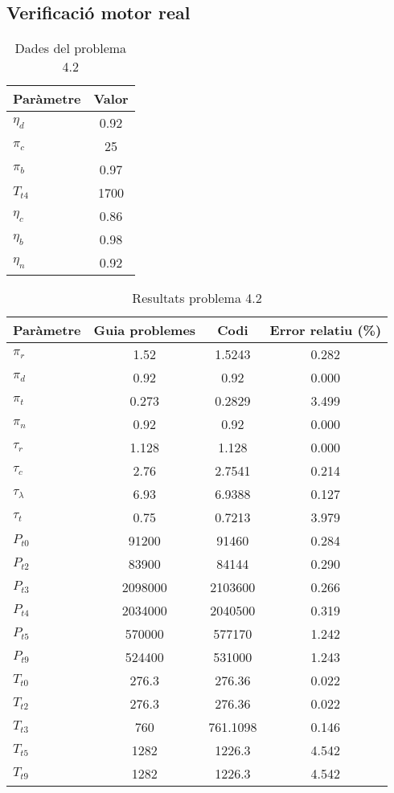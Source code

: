\subsection{Verificació motor real}
\begin{table}[H]
\centering
\begin{tabular}{lc}
\toprule[3pt]
\textbf{Paràmetre}&\textbf{Valor}\\
\midrule[1pt]
$\eta_d$&	0.92\\

$\pi_c$&	25\\

$\pi_b$&0.97\\

$T_{t4}$	&1700\\

$\eta_c$&0.86\\

$\eta_b$&0.98\\

$\eta_n$&0.92\\
\bottomrule[2pt]
\end{tabular}
\caption{Dades del problema 4.2}
\end{table}
\begin{table}[H]
\centering
\begin{tabular}{lccc}
\toprule[3pt]
Paràmetre & Guia problemes & Codi       & Error relatiu (\%) \\ \midrule[1pt]
$\pi_r$ & 1.52    & 1.5243   & 0.282 \\
$\pi_d$ & 0.92    & 0.92     & 0.000 \\
$\pi_t$ & 0.273   & 0.2829   & 3.499 \\
$\pi_n$& 0.92    & 0.92     & 0.000 \\
$\tau_r$& 1.128   & 1.128    & 0.000 \\
$\tau_c$& 2.76    & 2.7541   & 0.214 \\
$\tau_\lambda$& 6.93    & 6.9388   & 0.127 \\
$\tau_t$& 0.75    & 0.7213   & 3.979 \\
$P_{t0}$& 91200   & 91460    & 0.284 \\
$P_{t2}$& 83900   & 84144    & 0.290 \\
$P_{t3}$& 2098000 & 2103600  & 0.266 \\
$P_{t4}$& 2034000 & 2040500  & 0.319 \\
$P_{t5}$& 570000  & 577170   & 1.242 \\
$P_{t9}$& 524400  & 531000   & 1.243 \\
$T_{t0}$& 276.3   & 276.36   & 0.022 \\
$T_{t2}$& 276.3   & 276.36   & 0.022 \\
$T_{t3}$& 760     & 761.1098 & 0.146 \\
$T_{t5}$& 1282    & 1226.3   & 4.542 \\
$T_{t9}$ & 1282    & 1226.3   & 4.542
 \\ \bottomrule[2pt]
\end{tabular}
\caption{Resultats problema 4.2}
\end{table}
	


